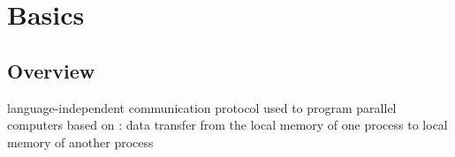 \documentclass{myproc}
\begin{document}
\small
{}

\tableofcontents

\section{Basics}
\subsection{Overview}
\bit
\w language-independent communication protocol used to program parallel
computers 
\w based on : data transfer from the local memory of one
process to local memory of another process
\eit
\end{document}
